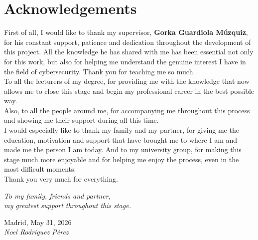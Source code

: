 \cleardoublepage

\chapter*{Acknowledgements}

First of all, I would like to thank my supervisor, \textbf{Gorka Guardiola Múzquiz}, for his constant support, patience and dedication throughout the development of this project.
All the knowledge he has shared with me has been essential not only for this work, but also for helping me understand the genuine interest I have in the field of cybersecurity.
Thank you for teaching me so much.\\

To all the lecturers of my degree, for providing me with the knowledge that now allows me to close this stage and begin my professional career in the best possible way.\\

Also, to all the people around me, for accompanying me throughout this process and showing me their support during all this time.\\

I would especially like to thank my family and my partner, for giving me the education, motivation and support that have brought me to where I am and made me the person I am today.
And to my university group, for making this stage much more enjoyable and for helping me enjoy the process, even in the most difficult moments.\\

Thank you very much for everything.

\begin{flushright}
		\vspace{3.0 cm}
		\emph{To my family, friends and partner,\\
      my greatest support throughout this stage.}\\
		\par
		\vspace{0.5 cm}
		Madrid, May 31, 2026\\ %
		\emph{Noel Rodríguez Pérez}
\end{flushright}

\thispagestyle{empty}
